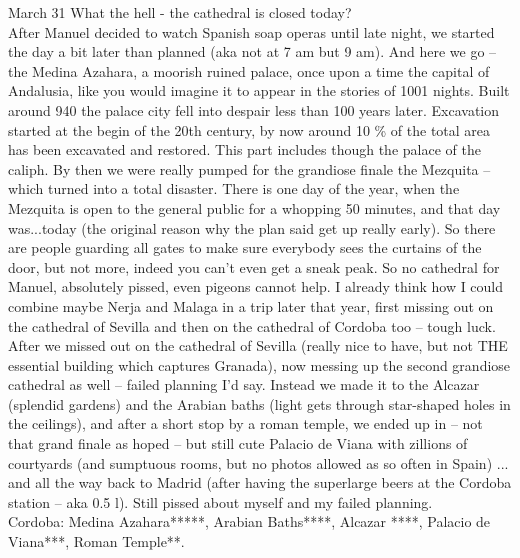 March 31 What the hell - the cathedral is closed today?\\
After Manuel decided to watch Spanish soap operas until late night, we started the day a bit later than planned (aka not at 7 am but 9 am). And here we go -- the Medina Azahara, a moorish ruined palace, once upon a time the capital of Andalusia, like you would imagine it to appear in the stories of 1001 nights. Built around 940 the palace city fell into despair less than 100 years later. Excavation started at the begin of the 20th century, by now around 10 \% of the total area has been excavated and restored. This part includes though the palace of the caliph. By then we were really pumped for the grandiose finale the Mezquita -- which turned into a total disaster. There is one day of the year, when the Mezquita is open to the general public for a whopping 50 minutes, and that day was...today (the original reason why the plan said get up really early).  So there are people guarding all gates to make sure everybody sees the curtains of the door, but not more, indeed you can't even get a sneak peak. So no cathedral for Manuel, absolutely pissed, even pigeons cannot help. I already think how I could combine maybe Nerja and Malaga in a trip later that year, first missing out on the cathedral of Sevilla and then on the cathedral of Cordoba too -- tough luck. After we missed out on the cathedral of Sevilla (really nice to have, but not THE essential building which captures Granada), now messing up the second grandiose cathedral as well -- failed planning I'd say. Instead we made it to the Alcazar (splendid gardens) and the Arabian baths (light gets through star-shaped holes in the ceilings), and after a short stop by a roman temple, we ended up in -- not that grand finale as hoped -- but still cute Palacio de Viana with zillions of courtyards (and sumptuous rooms, but no photos allowed as so often in Spain) ... and all the way back to Madrid (after having the superlarge beers at the Cordoba station -- aka 0.5 l). Still pissed about myself and my failed planning.\\

Cordoba:
Medina Azahara*****,
Arabian Baths****,
Alcazar ****,
Palacio de Viana***,
Roman Temple**. \\

